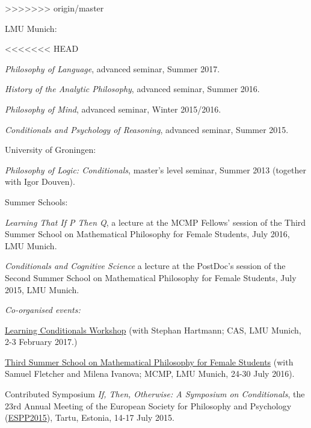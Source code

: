 \documentclass[11pt,article,oneside]{memoir}
\begin{document}
\begin{itemize}
\begin{itemize}
>>>>>>> origin/master

\noindent LMU Munich:

<<<<<<< HEAD
\medskip

\ind \emph{Philosophy of Language}, advanced seminar, Summer 2017.

\ind \emph{History of the Analytic Philosophy}, advanced seminar, Summer 2016.

\ind \emph{Philosophy of Mind}, advanced seminar, Winter 2015/2016.

\ind \emph{Conditionals and Psychology of Reasoning}, advanced seminar, Summer 2015.

\medskip

\noindent University of Groningen:

\medskip

\ind \emph{Philosophy of Logic: Conditionals}, master's level seminar, Summer 2013 (together with Igor Douven).

\medskip

\noindent Summer Schools:

\medskip

\ind \emph{Learning That If P Then Q}, a lecture at the MCMP Fellows' session of the Third Summer School on Mathematical Philosophy for Female Students, July 2016, LMU Munich.

\ind \emph{Conditionals and Cognitive Science} a lecture at the PostDoc's session of the Second Summer School on Mathematical Philosophy for Female Students, July 2015, LMU Munich.


\bigskip

\medskip

\ind \emph{Co-organised events:}
	
	\medskip
	\ind \href{http://www.cas.uni-muenchen.de/veranstaltungen/tagungen/ws_krzyzanowska_hartmann/index.html}{Learning Conditionals Workshop} (with Stephan Hartmann; CAS, LMU Munich, 2-3 February 2017.)
 
	\ind \href{http://www.mathsummer.philosophie.uni-muenchen.de}{Third Summer School on Mathematical Philosophy for Female Students} (with Samuel Fletcher and Milena Ivanova; MCMP, LMU Munich, 24-30 July 2016).

	\ind Contributed Symposium \emph{If, Then, Otherwise: A Symposium on Conditionals}, the 23rd Annual Meeting of the European Society for Philosophy and Psychology (\href{http://espp2015.ut.ee}{ESPP2015}), Tartu, Estonia, 14-17 July 2015.


\end{itemize}
\end{itemize}
\end{document}
